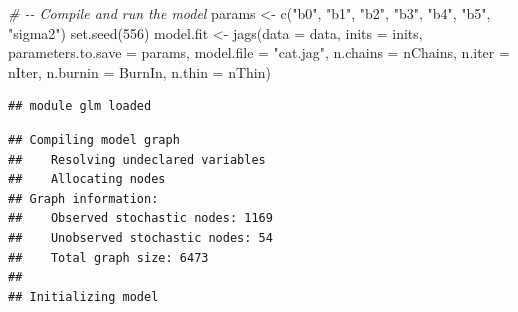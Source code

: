 \documentclass[
]{article}
\newenvironment{Shaded}{\begin{snugshade}}{\end{snugshade}}
\newcommand{\AttributeTok}[1]{\textcolor[rgb]{0.77,0.63,0.00}{#1}}
\newcommand{\CommentTok}[1]{\textcolor[rgb]{0.56,0.35,0.01}{\textit{#1}}}
\newcommand{\DecValTok}[1]{\textcolor[rgb]{0.00,0.00,0.81}{#1}}
\newcommand{\FunctionTok}[1]{\textcolor[rgb]{0.00,0.00,0.00}{#1}}
\newcommand{\NormalTok}[1]{#1}
\newcommand{\OtherTok}[1]{\textcolor[rgb]{0.56,0.35,0.01}{#1}}
\newcommand{\StringTok}[1]{\textcolor[rgb]{0.31,0.60,0.02}{#1}}
\begin{document}
\begin{Shaded}
\begin{Highlighting}[]
\CommentTok{\# {-}{-} Compile and run the model}
\NormalTok{params }\OtherTok{\textless{}{-}} \FunctionTok{c}\NormalTok{(}\StringTok{"b0"}\NormalTok{, }\StringTok{"b1"}\NormalTok{, }\StringTok{"b2"}\NormalTok{, }\StringTok{"b3"}\NormalTok{, }\StringTok{"b4"}\NormalTok{, }\StringTok{"b5"}\NormalTok{, }\StringTok{"sigma2"}\NormalTok{)}
\FunctionTok{set.seed}\NormalTok{(}\DecValTok{556}\NormalTok{)}
\NormalTok{model.fit }\OtherTok{\textless{}{-}} \FunctionTok{jags}\NormalTok{(}\AttributeTok{data =}\NormalTok{ data,}
                  \AttributeTok{inits =}\NormalTok{ inits,}
                  \AttributeTok{parameters.to.save =}\NormalTok{ params,}
                  \AttributeTok{model.file =} \StringTok{"cat.jag"}\NormalTok{,}
                  \AttributeTok{n.chains =}\NormalTok{ nChains,}
                  \AttributeTok{n.iter =}\NormalTok{ nIter,}
                  \AttributeTok{n.burnin =}\NormalTok{ BurnIn,}
                  \AttributeTok{n.thin =}\NormalTok{ nThin)}
\end{Highlighting}
\end{Shaded}

\begin{verbatim}
## module glm loaded
\end{verbatim}

\begin{verbatim}
## Compiling model graph
##    Resolving undeclared variables
##    Allocating nodes
## Graph information:
##    Observed stochastic nodes: 1169
##    Unobserved stochastic nodes: 54
##    Total graph size: 6473
## 
## Initializing model
\end{verbatim}
\end{document}
